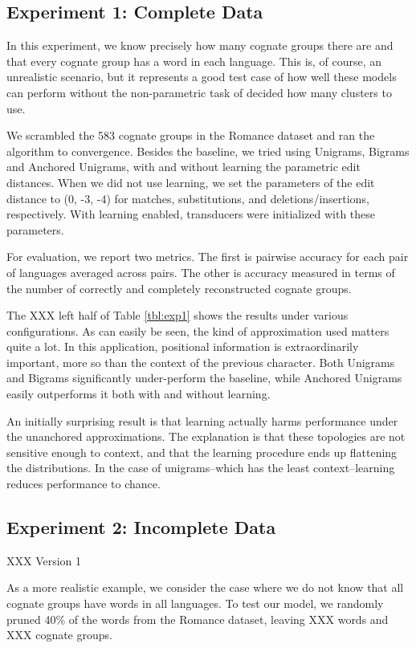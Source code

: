 \documentclass[11pt,a4paper]{article}
\begin{document}
\subsection{Experiment 1: Complete Data}

In this experiment, we know precisely how many cognate groups there
are and that every cognate group has a word in each language. This
is, of course, an unrealistic scenario, but it represents a good
test case of how well these models can perform without the
non-parametric task of decided how many clusters to use.

We scrambled the 583 cognate groups in the Romance dataset and ran
the algorithm to convergence. Besides the baseline, we tried using
Unigrams, Bigrams and Anchored Unigrams, with and without learning
the parametric edit distances. When we did not use learning, we set
the parameters of the edit distance to (0, -3, -4) for matches,
substitutions, and deletions/insertions, respectively. With learning
enabled, transducers were initialized with these parameters.

For evaluation, we report two metrics. The first is pairwise accuracy
for each pair of languages averaged across pairs. The other is
accuracy measured in terms of the number of correctly and completely
reconstructed cognate groups.

The XXX left half of Table \ref{tbl:exp1} shows the results under
various configurations. As can easily be seen, the kind of approximation
used matters quite a lot. In this application, positional information
is extraordinarily important, more so than the context of the
previous character. Both Unigrams and Bigrams significantly
under-perform the baseline, while Anchored Unigrams easily outperforms
it both with and without learning.

An initially surprising result is that learning actually harms
performance under the unanchored approximations. The explanation
is that these topologies are not sensitive enough to context, and
that the learning procedure ends up flattening the distributions.
In the case of unigrams--which has the least context--learning
reduces performance to chance.

\subsection{Experiment 2: Incomplete Data}

XXX Version 1

As a more realistic example, we consider the case where we do not
know that all cognate groups have words in all languages. To test
our model, we randomly pruned 40\% of the words from the Romance
dataset, leaving XXX words and XXX cognate groups.
\end{document}
